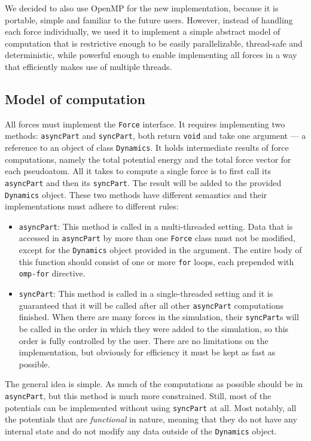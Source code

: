 We decided to also use OpenMP for the new implementation, because it is portable, simple and familiar to the future users. However, instead of  handling each force individually, we used it to implement a simple abstract model of computation that is restrictive enough to be easily parallelizable, thread-safe and deterministic, while powerful enough to enable implementing all forces in a way that efficiently makes use of multiple threads. 

\subsection{Model of computation}

All forces must implement the \texttt{Force} interface. It requires implementing two methods: \texttt{asyncPart} and \texttt{syncPart}, both return \texttt{void} and take one argument --- a reference to an object of class \texttt{Dynamics}. It holds intermediate results of force computations, namely the total potential energy and the total force vector for each pseudoatom. All it takes to compute a single force is to first call its \texttt{asyncPart} and then its \texttt{syncPart}. The result will be added to the provided \texttt{Dynamics} object. These two methods have different semantics and their implementations must adhere to different rules:

\begin{itemize}
    \item \texttt{asyncPart}: This method is called in a multi-threaded setting. Data that is accessed in \texttt{asyncPart} by more than one \texttt{Force} class must not be modified, except for the \texttt{Dynamics} object provided in the argument. The entire body of this function should consist of one or more \texttt{for} loops, each prepended with \texttt{omp-for} directive.
    
    \item \texttt{syncPart}: This method is called in a single-threaded setting and it is guaranteed that it will be called after all other \texttt{asyncPart} computations finished. When there are many forces in the simulation, their \texttt{syncPart}s will be called in the order in which they were added to the simulation, so this order is fully controlled by the user. There are no limitations on the implementation, but obviously for efficiency it must be kept as fast as possible. 
\end{itemize}


The general idea is simple. As much of the computations as possible should be in \texttt{asyncPart}, but this method is much more constrained. Still, most of the potentials can be implemented without using \texttt{syncPart} at all. Most notably, all the potentials that are \emph{functional} in nature, meaning that they do not have any internal state and do not modify any data outside of the \texttt{Dynamics} object. 

